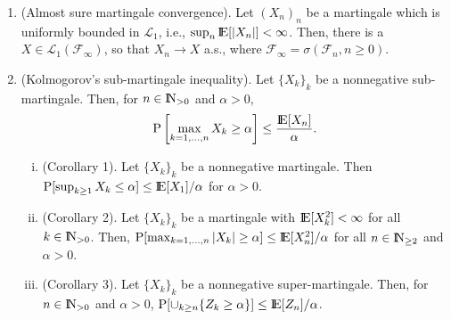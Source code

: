 \documentclass[a4paper,10pt]{scrbook}
\begin{document}
\begin{enumerate}
 \item (Almost sure martingale convergence). Let $(X_n)_n$ be a martingale which is uniformly 
       bounded in $\mathcal{L}_1$, i.e., $\sup_n \E[|X_n|] < \infty$. Then, there is a $X\in\mathcal{L}_1(\mathcal{F}_\infty)$,
       so that $X_n\to X$ a.s., where $\mathcal{F}_\infty = \sigma(\mathcal{F}_n, n\geq 0)$.
 \item (Kolmogorov's sub-martingale inequality). Let $\{X_k\}_k$ be a nonnegative sub-martingale.
       Then, for $n\in\N_{>0}$ and $\alpha>0$,
       \[
        \prob\left[ \max_{k=1,\ldots, n}X_k \geq \alpha\right] \leq \frac{\E[X_n]}{\alpha}.
       \]
       \begin{enumerate}[i.]
        \item (Corollary 1). Let $\{X_k\}_k$ be a nonnegative martingale. 
              Then $\prob[\sup_{k\geq 1}X_k \leq \alpha]\leq\E[X_1]/\alpha$ for $\alpha>0$.
        \item (Corollary 2). Let $\{X_k\}_k$ be a martingale with $\E[X_k^2]< \infty$ for all $k\in\N_{>0}$. 
               Then, $\prob[\max_{k=1,\ldots, n}|X_k|\geq \alpha]\leq \E[X_n^2]/\alpha$ for all $n\in \N_{\geq 2}$
               and $\alpha>0$.
        \item (Corollary 3). Let $\{X_k\}_k$ be a nonnegative super-martingale. Then, for $n\in\N_{>0}$
              and $\alpha>0$, $\prob[\cup_{k\geq n}\{Z_k\geq \alpha\}]\leq\E[Z_n]/\alpha$.
       \end{enumerate}



\end{enumerate}
\end{document}
